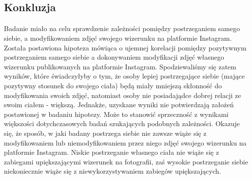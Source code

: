 \documentclass[12pt,a4paper,final,oneside,onecolumn,titlepage]{article}
\begin{document}
\subsection*{\normalsize{\textbf{Konkluzja}}}
\paragraph{}
Badanie miało na celu sprawdzenie zależności pomiędzy postrzeganiem samego siebie, a modyfikowaniem zdjęć swojego wizerunku na platformie Instagram. Została postawiona hipoteza mówiąca o ujemnej korelacji pomiędzy pozytywnym postrzeganiem samego siebie a dokonywaniem modyfikacji zdjęć własnego wizerunku publikowanych na platformie Instagram. Spodziewaliśmy się zatem wyników, które świadczyłyby o tym, że osoby lepiej postrzegające siebie (mające pozytywny stosunek do swojego ciała) będą miały mniejszą skłonność do modyfikowania swoich zdjęć, natomiast osoby nie posiadajądce dobrej relacji ze swoim ciałem - większą. Jednakże, uzyskane wyniki nie potwierdzają założeń postawionej w badaniu hipotezy. Może to stanowić sprzeczność z wynikami większości dotychczasowych badań szukających podobnych zależności. Okazuje się, że sposób, w jaki badany postrzega siebie nie zawsze wiąże się z modyfikowaniem lub niemodyfikowaniem przez niego zdjęć swojego wizerunku na platformie Instagram. Niskie postrzeganie własnego ciała nie wiąże się z zabiegami upiększającymi wizerunek na fotografii, zaś wysokie postrzeganie siebie niekoniecznie wiąże się z niewykorzystywaniem zabiegów upiększających.
\end{document}

